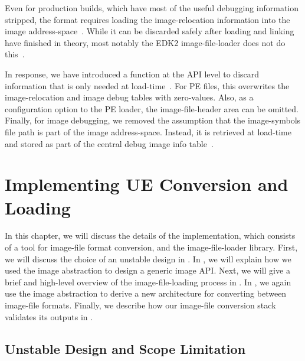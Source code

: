 Even for production builds, which have most of the useful debugging information stripped, the  format requires loading the \gls{image-relocation} information into the \gls{image} \gls{address-space}~\cite{pe-format}. While it can be discarded safely after loading and linking have finished in theory, most notably the \gls{EDK2}  \gls{image-file-loader} does not do this~\cite{edk2}.

In response, we have introduced a function at the \gls{API} level to discard information that is only needed at load-time~\cite{audk}. For \gls{PE} files, this overwrites the \gls{image-relocation} and \gls{image} debug tables with zero-values. Also, as a configuration option to the \gls{PE} loader, the \gls{image-file-header} area can be omitted. Finally, for \gls{image} debugging, we removed the assumption that the \glspl{image-symbol} file path is part of the \gls{image} \gls{address-space}. Instead, it is retrieved at load-time and stored as part of the central  debug \gls{image} info table~\cite{uefi-spec}.

\chapter{Implementing UE Conversion and Loading}
\label{chap:uefi_exec_impl}

In this chapter, we will discuss the details of the implementation, which consists of a tool for \gls{image-file} format conversion, and the \gls{image-file-loader} \gls{library}. First, we will discuss the choice of an unstable design in . In , we will explain how we used the \gls{image} abstraction to design a generic  \gls{image} \gls{API}. Next, we will give a brief and high-level overview of the \gls{image-file-loading} process in . In , we again use the \gls{image} abstraction to derive a new architecture for converting between \gls{image-file} formats. Finally, we describe how our \gls{image-file} conversion stack validates its outputs in .

\section{Unstable Design and Scope Limitation}
\label{sec:unstable_design}

